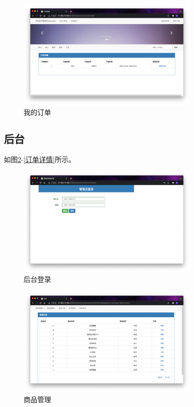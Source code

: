 \documentclass[11pt]{homework}
\begin{document}
    \begin{figure}[h]
      \centering
      \includegraphics[width=0.8\textwidth]{我的订单}
      \caption{我的订单}
      \label{我的订单}
    \end{figure}

  \subsection*{后台}

  如图\ref{后台登录}-\ref{订单详情}所示。

    \begin{figure}[h]
      \centering
      \includegraphics[width=0.8\textwidth]{后台登录}
      \caption{后台登录}
      \label{后台登录}
    \end{figure}

    \begin{figure}[h]
      \centering
      \includegraphics[width=0.8\textwidth]{商品管理}
      \caption{商品管理}
      \label{商品管理}
    \end{figure}
\end{document}
